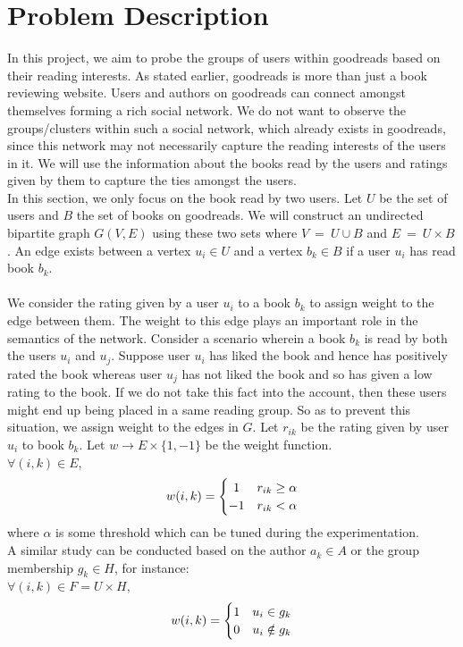 \documentclass[11pt]{article}
\begin{document}
\section{Problem Description}
In this project, we aim to probe the groups of users within goodreads based on their reading interests. As stated earlier, goodreads is more than just a book reviewing website. Users and authors on goodreads can connect amongst themselves forming a rich social network. We do not want to observe the groups/clusters within such a social network, which already exists in goodreads, since this network may not necessarily capture the reading interests of the users in it. We will use the information about the books read by the users and ratings given by them to capture the ties amongst the users.\\

In this section, we only focus on the book read by two users. Let $U$ be the set of users and $B$ the set of books on goodreads. We will construct an undirected bipartite graph $G(V, E)$ using these two sets where $V ~=~ U \cup B$ and $E~=~U \times B$. An edge exists between a vertex $u_i \in U$ and a vertex $b_k \in B$ if a user $u_i$ has read book $b_k$.\\\\
We consider the rating given by a user $u_i$ to a book $b_k$ to assign weight to the edge between them. The weight to this edge plays an important role in the semantics of the network. Consider a scenario wherein a book $b_k$ is read by both the users $u_i$ and $u_j$. Suppose user $u_i$ has liked the book and hence has positively rated the book whereas user $u_j$ has not liked the book and so has given a low rating to the book. If we do not take this fact into the account, then these users might end up being placed in a same reading group. So as to prevent this situation, we assign weight to the edges in $G$. Let $r_{ik}$ be the rating given by user $u_i$ to book $b_k$. Let $w \rightarrow E \times \{1, -1\}$ be the weight function.\\
$\forall (i, k) \in E$, 
\[
    w(i, k) = \left\{\def\arraystretch{1.2}%
        \begin{array}{@{}c@{\quad}l@{}}
        1 & r_{ik} \geq \alpha\\
        -1 & r_{ik} < \alpha\\
        \end{array}\right.
\]
where $\alpha$ is some threshold which can be tuned during the experimentation.\\
A similar study can be conducted based on the author $a_k \in A$ or the group membership $g_k \in H$, for instance:\\
$\forall (i, k) \in F=U \times H$, 
\[
    w(i, k) = \left\{\def\arraystretch{1.2}%
        \begin{array}{@{}c@{\quad}l@{}}
        1 & u_i \in g_k\\
        0 & u_i \notin g_k\\
        \end{array}\right.
\]
\\
\end{document}
